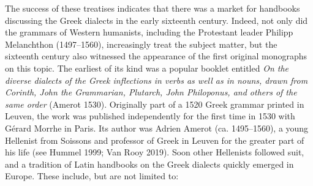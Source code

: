 \begin{styleStandard}
The success of these treatises indicates that there was a market for handbooks discussing the Greek dialects in the early sixteenth century. Indeed, not only did the grammars of Western humanists, including the Protestant leader Philipp Melanchthon (1497–1560), increasingly treat the subject matter, but the sixteenth century also witnessed the appearance of the first original monographs on this topic. The earliest of its kind was a popular booklet entitled \textit{On the diverse dialects of the Greek inflections in verbs as well as in nouns, drawn from Corinth, John the Grammarian, Plutarch, John Philoponus, and others of the same order} (Amerot 1530). Originally part of a 1520 Greek grammar printed in Leuven, the work was published independently for the first time in 1530 with Gérard Morrhe in Paris. Its author was Adrien Amerot (ca. 1495–1560), a young Hellenist from Soissons and professor of Greek in Leuven for the greater part of his life (see Hummel 1999; Van Rooy 2019). Soon other Hellenists followed suit, and a tradition of Latin handbooks on the Greek dialects quickly emerged in Europe. These include, but are not limited to:
\end{styleStandard}

